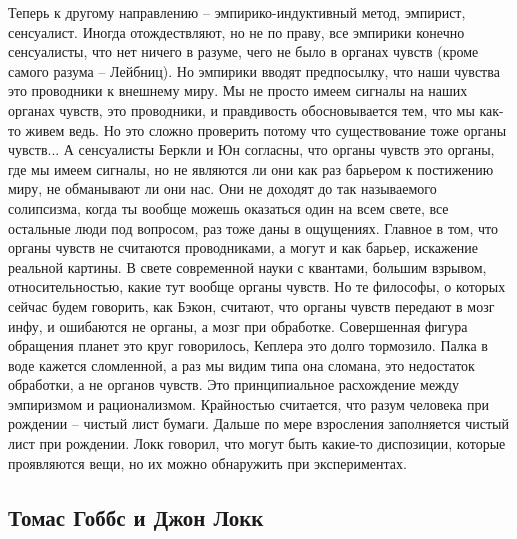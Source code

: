 \documentclass[a4paper, 12pt]{article}
\begin{document}
Теперь к другому направлению -- эмпирико-индуктивный метод, эмпирист, 
сенсуалист. Иногда отождествляют, но не по праву, все эмпирики конечно 
сенсуалисты, что нет ничего в разуме, чего не было в органах чувств 
(кроме самого разума -- Лейбниц). Но эмпирики вводят предпосылку, что 
наши чувства это проводники к внешнему миру. Мы не просто имеем сигналы 
на наших органах чувств, это проводники, и правдивость обосновывается 
тем, что мы как-то живем ведь. Но это сложно проверить потому что 
существование тоже органы чувств... А сенсуалисты Беркли и Юн согласны, 
что органы чувств это органы, где мы имеем сигналы, но не являются ли 
они как раз барьером к постижению миру, не обманывают ли они нас. Они не 
доходят до так называемого солипсизма, когда ты вообще можешь оказаться 
один на всем свете, все остальные люди под вопросом, раз тоже даны 
в ощущениях. Главное в том, что органы чувств не считаются проводниками, 
а могут и как барьер, искажение реальной картины. В свете современной 
науки с квантами, большим взрывом, относительностью, какие тут вообще 
органы чувств. Но те философы, о которых сейчас будем говорить, как 
Бэкон, считают, что органы чувств передают в мозг инфу, и ошибаются не 
органы, а мозг при обработке. Совершенная фигура обращения планет это 
круг говорилось, Кеплера это долго тормозило. Палка в воде кажется 
сломленной, а раз мы видим типа она сломана, это недостаток обработки, 
а не органов чувств. Это принципиальное расхождение между эмпиризмом 
и рационализмом. Крайностью считается, что разум человека при рождении 
-- чистый лист бумаги. Дальше по мере взросления заполняется чистый лист 
при рождении. Локк говорил, что могут быть какие-то диспозиции, которые 
проявляются вещи, но их можно обнаружить при экспериментах.


\subsection{Томас Гоббс и Джон Локк}
\end{document}
